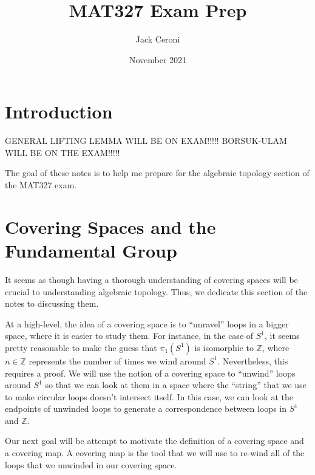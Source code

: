 \documentclass[10pt, oneside]{amsart}
\title{MAT327 Exam Prep}
\author{Jack Ceroni}
\date{November 2021}
\begin{document}
    \maketitle

    \tableofcontents

    \vspace{.25in}

    \newpage

    \section{Introduction}

    GENERAL LIFTING LEMMA WILL BE ON EXAM!!!!!
    BORSUK-ULAM WILL BE ON THE EXAM!!!!!
    \newline

    The goal of these notes is to help me prepare for the algebraic topology section of the MAT327 exam.

    \section{Covering Spaces and the Fundamental Group}

    It seems as though having a thorough understanding of covering spaces will be crucial to understanding algebraic topology. Thus, we dedicate this section of the notes to discussing them.
    \newline

    At a high-level, the idea of a covering space is to ``unravel'' loops in a bigger space, where it is easier to study them. For instance, in the case of $S^1$, it seems pretty reasonable to
    make the guess that $\pi_1(S^1)$ is isomorphic to $\mathbb{Z}$, where $n \in \mathbb{Z}$ represents the number of times we wind around $S^1$. Nevertheless, this requires a proof. We will use the
    notion of a covering space to ``unwind'' loops around $S^1$ so that we can look at them in a space where the ``string'' that we use to make circular loops doesn't intersect itself. In this case,
    we can look at the endpoints of unwinded loops to generate a correspondence between loops in $S^1$ and $\mathbb{Z}$.
    \newline

    Our next goal will be attempt to motivate the definition of a covering space and a covering map. A covering map is the tool that we will use to re-wind all of the loops that we unwinded in our covering space.
    \newline
\end{document}
